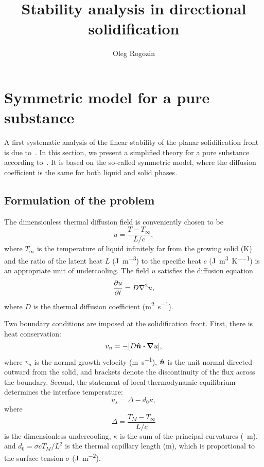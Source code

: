 \documentclass{article}
\title{Stability analysis in directional solidification}
\author{Oleg Rogozin}
\newcommand{\bn}{\vu*{n}}
\begin{document}
\maketitle
\tableofcontents

\section{Symmetric model for a pure substance}

A first systematic analysis of the linear stability of the planar solidification front is due to~\textcite{mullins1964stability}.
In this section, we present a simplified theory for a pure substance according to~\textcite{langer1987lectures}.
It is based on the so-called symmetric model, where the diffusion coefficient is the same for both liquid and solid phases.

\subsection{Formulation of the problem}

The dimensionless thermal diffusion field is conveniently chosen to be
\begin{equation}\label{eq:u}
    u = \frac{T-T_\infty}{L/c},
\end{equation}
where $T_\infty$ is the temperature of liquid infinitely far from the growing solid (\si{\K})
and the ratio of the latent heat $L$ (\si{\J\per\m\cubed}) to the specific heat $c$ (\si{\J\per\m\cubed\per\K})
is an appropriate unit of undercooling.
The field $u$ satisfies the diffusion equation
\begin{equation}\label{eq:diffusion}
    \pdv{u}{t} = D\nabla^2u,
\end{equation}
where $D$ is the thermal diffusion coefficient (\si{\m\squared\per\s}).

Two boundary conditions are imposed at the solidification front.
First, there is heat conservation:
\begin{equation}\label{eq:bc1}
    v_n = -[D\bn\vdot\grad{u}],
\end{equation}
where $v_n$ is the normal growth velocity (\si{\m\per\s}),
$\bn$ is the unit normal directed outward from the solid,
and brackets denote the discontinuity of the flux across the boundary.
Second, the statement of local thermodynamic equilibrium determines the interface temperature:
\begin{equation}\label{eq:bc2}
    u_s = \Delta - d_0\kappa,
\end{equation}
where
\begin{equation}\label{eq:undercooling}
    \Delta = \frac{T_M - T_\infty}{L/c}
\end{equation}
is the dimensionless undercooling,
$\kappa$ is the sum of the principal curvatures (\si{\per\m}), and
$d_0 = \sigma c T_M/L^2$ is the thermal capillary length (\si{\m}),
which is proportional to the surface tension $\sigma$ (\si{\J\per\m\squared}).
\end{document}
